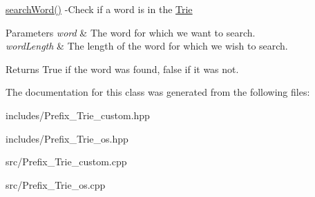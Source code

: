 \hyperlink{class_trie_a3760a51720b288a6628360008977de6f}{search\+Word()} -\/\+Check if a word is in the \hyperlink{class_trie}{Trie} 
\begin{DoxyParams}{Parameters}
{\em word} & The word for which we want to search. \\
\hline
{\em word\+Length} & The length of the word for which we wish to search. \\
\hline
\end{DoxyParams}
\begin{DoxyReturn}{Returns}
True if the word was found, false if it was not. 
\end{DoxyReturn}


The documentation for this class was generated from the following files\+:\begin{DoxyCompactItemize}
\item 
includes/Prefix\+\_\+\+Trie\+\_\+custom.\+hpp\item 
includes/Prefix\+\_\+\+Trie\+\_\+os.\+hpp\item 
src/Prefix\+\_\+\+Trie\+\_\+custom.\+cpp\item 
src/Prefix\+\_\+\+Trie\+\_\+os.\+cpp\end{DoxyCompactItemize}
